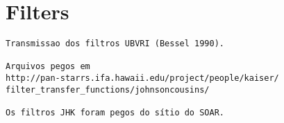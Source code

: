 
\chapter{Filters}
\begin{verbatim}
Transmissao dos filtros UBVRI (Bessel 1990).

Arquivos pegos em 
http://pan-starrs.ifa.hawaii.edu/project/people/kaiser/
filter_transfer_functions/johnsoncousins/

Os filtros JHK foram pegos do sítio do SOAR.
\end{verbatim}
